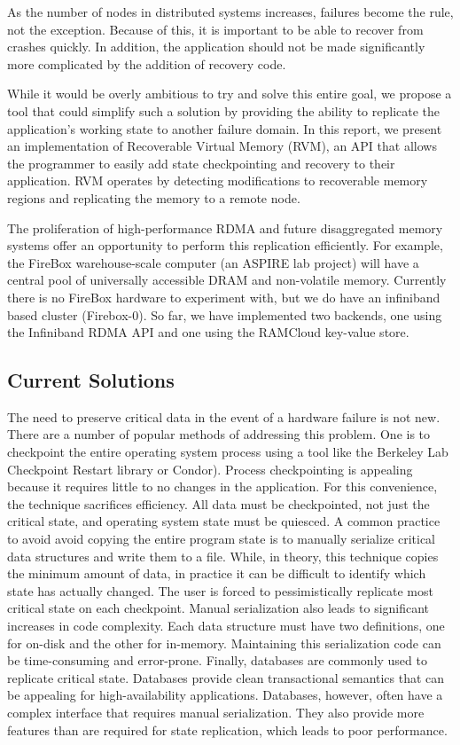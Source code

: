 As the number of nodes in distributed systems increases, failures become the
rule, not the exception. Because of this, it is important to be able to recover
from crashes quickly.  In addition, the application should not be made
significantly more complicated by the addition of recovery code.

While it would be overly ambitious to try and solve this entire goal, we propose
a tool that could simplify such a solution by providing the ability to replicate
the application's working state to another failure domain. In this report, we
present an implementation of Recoverable Virtual Memory (RVM), an API that
allows the programmer to easily add state checkpointing and recovery to their
application. RVM operates by detecting modifications to recoverable memory
regions and replicating the memory to a remote node.

The proliferation of high-performance RDMA and future disaggregated memory
systems offer an opportunity to perform this replication efficiently. For
example, the FireBox warehouse-scale computer (an ASPIRE lab project) will have
a central pool of universally accessible DRAM and non-volatile memory. Currently
there is no FireBox hardware to experiment with, but we do have an infiniband
based cluster (Firebox-0). So far, we have implemented two backends, one using
the Infiniband RDMA API and one using the RAMCloud key-value store.

\subsection{Current Solutions}
The need to preserve critical data in the event of a hardware failure is not
new. There are a number of popular methods of addressing this problem. One is to
checkpoint the entire operating system process using a tool like the Berkeley
Lab Checkpoint Restart library\cite{BLCR} or Condor\cite{Condor}). Process
checkpointing is appealing because it requires little to no changes in the
application. For this convenience, the technique sacrifices efficiency. All data
must be checkpointed, not just the critical state, and operating system state
must be quiesced. A common practice to avoid avoid copying the entire program
state is to manually serialize critical data structures and write them to a
file. While, in theory, this technique copies the minimum amount of data, in
practice it can be difficult to identify which state has actually changed. The
user is forced to pessimistically replicate most critical state on each
checkpoint. Manual serialization also leads to significant increases in code
complexity. Each data structure must have two definitions, one for on-disk and
the other for in-memory. Maintaining this serialization code can be
time-consuming and error-prone. Finally, databases are commonly used to
replicate critical state.
Databases provide clean transactional semantics that can be appealing for
high-availability applications. Databases, however, often have a complex
interface that requires manual serialization. They also provide more features
than are required for state replication, which leads to poor performance.

